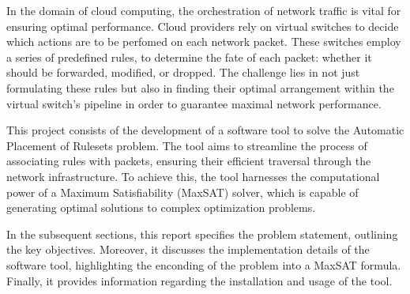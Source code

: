 In the domain of cloud computing, the orchestration of network traffic is vital for ensuring optimal performance. Cloud providers rely on virtual switches to decide which actions are to be perfomed on each network packet. These switches employ a series of predefined rules, to determine the fate of each packet: whether it should be forwarded, modified, or dropped. The challenge lies in not just formulating these rules but also in finding their optimal arrangement within the virtual switch's pipeline in order to guarantee maximal network performance.

This project consists of the development of a software tool to solve the Automatic Placement of Rulesets problem. The tool aims to streamline the process of associating rules with packets, ensuring their efficient traversal through the network infrastructure. To achieve this, the tool harnesses the computational power of a Maximum Satisfiability (MaxSAT) solver, which is capable of generating optimal solutions to complex optimization problems.

In the subsequent sections, this report specifies the problem statement, outlining the key objectives. Moreover, it discusses the implementation details of the software tool, highlighting the enconding of the problem into a MaxSAT formula. Finally, it provides information regarding the installation and usage of the tool.